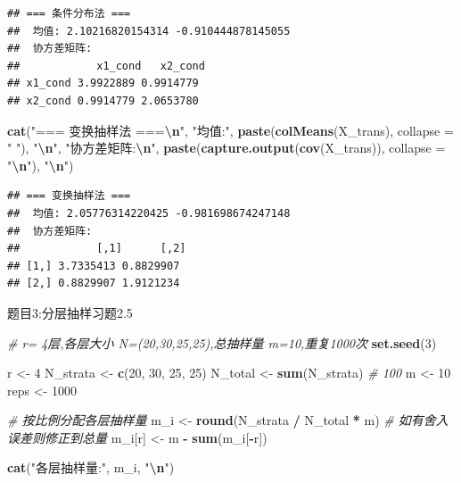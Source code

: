 \documentclass[
]{article}
\newenvironment{Shaded}{\begin{snugshade}}{\end{snugshade}}
\newcommand{\AttributeTok}[1]{\textcolor[rgb]{0.13,0.29,0.53}{#1}}
\newcommand{\CommentTok}[1]{\textcolor[rgb]{0.56,0.35,0.01}{\textit{#1}}}
\newcommand{\DecValTok}[1]{\textcolor[rgb]{0.00,0.00,0.81}{#1}}
\newcommand{\FunctionTok}[1]{\textcolor[rgb]{0.13,0.29,0.53}{\textbf{#1}}}
\newcommand{\NormalTok}[1]{#1}
\newcommand{\OtherTok}[1]{\textcolor[rgb]{0.56,0.35,0.01}{#1}}
\newcommand{\SpecialCharTok}[1]{\textcolor[rgb]{0.81,0.36,0.00}{\textbf{#1}}}
\newcommand{\StringTok}[1]{\textcolor[rgb]{0.31,0.60,0.02}{#1}}
\begin{document}
\begin{verbatim}
## === 条件分布法 ===
##  均值: 2.10216820154314 -0.910444878145055 
##  协方差矩阵:
##            x1_cond   x2_cond
## x1_cond 3.9922889 0.9914779
## x2_cond 0.9914779 2.0653780
\end{verbatim}

\begin{Shaded}
\begin{Highlighting}[]
\FunctionTok{cat}\NormalTok{(}\StringTok{"=== 变换抽样法 ===}\SpecialCharTok{\textbackslash{}n}\StringTok{"}\NormalTok{,}
\StringTok{"均值:"}\NormalTok{, }\FunctionTok{paste}\NormalTok{(}\FunctionTok{colMeans}\NormalTok{(X\_trans), }\AttributeTok{collapse =} \StringTok{" "}\NormalTok{), }\StringTok{"}\SpecialCharTok{\textbackslash{}n}\StringTok{"}\NormalTok{,}
\StringTok{"协方差矩阵:}\SpecialCharTok{\textbackslash{}n}\StringTok{"}\NormalTok{,}
\FunctionTok{paste}\NormalTok{(}\FunctionTok{capture.output}\NormalTok{(}\FunctionTok{cov}\NormalTok{(X\_trans)), }\AttributeTok{collapse =} \StringTok{"}\SpecialCharTok{\textbackslash{}n}\StringTok{"}\NormalTok{), }\StringTok{"}\SpecialCharTok{\textbackslash{}n}\StringTok{"}\NormalTok{)}
\end{Highlighting}
\end{Shaded}

\begin{verbatim}
## === 变换抽样法 ===
##  均值: 2.05776314220425 -0.981698674247148 
##  协方差矩阵:
##            [,1]      [,2]
## [1,] 3.7335413 0.8829907
## [2,] 0.8829907 1.9121234
\end{verbatim}

题目3:分层抽样习题2.5

\begin{Shaded}
\begin{Highlighting}[]
\CommentTok{\# r= 4层,各层大小 N=(20,30,25,25),总抽样量 m=10,重复1000次}
\FunctionTok{set.seed}\NormalTok{(}\DecValTok{3}\NormalTok{)}

\NormalTok{r      }\OtherTok{\textless{}{-}} \DecValTok{4}
\NormalTok{N\_strata }\OtherTok{\textless{}{-}} \FunctionTok{c}\NormalTok{(}\DecValTok{20}\NormalTok{, }\DecValTok{30}\NormalTok{, }\DecValTok{25}\NormalTok{, }\DecValTok{25}\NormalTok{)}
\NormalTok{N\_total  }\OtherTok{\textless{}{-}} \FunctionTok{sum}\NormalTok{(N\_strata)   }\CommentTok{\# 100}
\NormalTok{m        }\OtherTok{\textless{}{-}} \DecValTok{10}
\NormalTok{reps     }\OtherTok{\textless{}{-}} \DecValTok{1000}

\CommentTok{\# 按比例分配各层抽样量}
\NormalTok{m\_i }\OtherTok{\textless{}{-}} \FunctionTok{round}\NormalTok{(N\_strata }\SpecialCharTok{/}\NormalTok{ N\_total }\SpecialCharTok{*}\NormalTok{ m)}
\CommentTok{\# 如有舍入误差则修正到总量}
\NormalTok{m\_i[r] }\OtherTok{\textless{}{-}}\NormalTok{ m }\SpecialCharTok{{-}} \FunctionTok{sum}\NormalTok{(m\_i[}\SpecialCharTok{{-}}\NormalTok{r])}

\FunctionTok{cat}\NormalTok{(}\StringTok{"各层抽样量:"}\NormalTok{, m\_i, }\StringTok{"}\SpecialCharTok{\textbackslash{}n}\StringTok{"}\NormalTok{)}
\end{Highlighting}
\end{Shaded}
\end{document}
